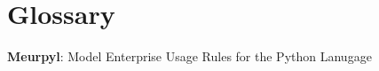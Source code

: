 \newcommand{\definition}[2]{
	\textbf{#1}: #2\newline
}

\section{Glossary}

\thispagestyle{section_start_style}

\definition{Meurpyl}{Model Enterprise Usage Rules for the Python Lanugage}